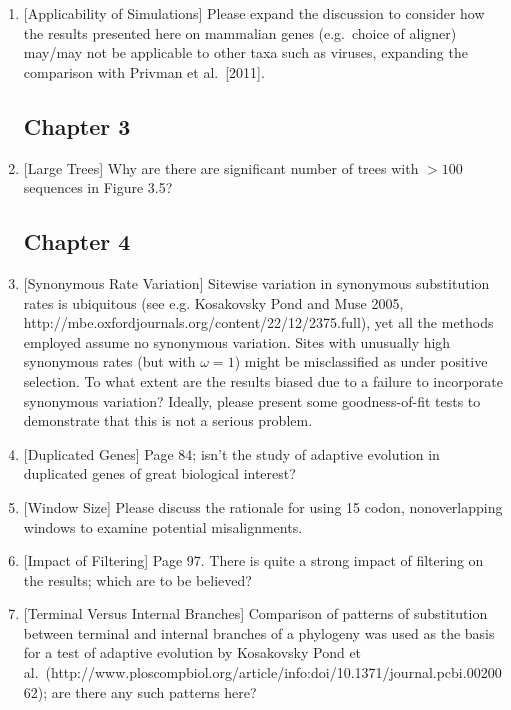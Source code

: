 \begin{enumerate}
\item{[Applicability of Simulations] Please expand the discussion to consider how the results presented
here on mammalian genes (e.g.\ choice of aligner) may/may not be
applicable to other taxa such as viruses, expanding the comparison
with Privman et al.\ [2011].}

\subsection{Chapter 3}

\item{[Large Trees] Why are there are significant number of trees with $>100$ sequences in
Figure 3.5?}

\subsection{Chapter 4}

\item{[Synonymous Rate Variation] Sitewise variation in synonymous substitution rates is ubiquitous (see
e.g. Kosakovsky Pond and Muse 2005,
http://mbe.oxfordjournals.org/content/22/12/2375.full), yet all the
methods employed assume no synonymous variation. Sites with unusually
high synonymous rates (but with $\omega=1$) might be misclassified as
under positive selection. To what extent are the results biased due to
a failure to incorporate synonymous variation? Ideally, please present
some goodness-of-fit tests to demonstrate that this is not a serious
problem.}

\item{[Duplicated Genes] Page 84; isn't the study of adaptive evolution in duplicated genes of
great biological interest?}

\item{[Window Size] Please discuss the rationale for using 15 codon, nonoverlapping
windows to examine potential misalignments.}

\item{[Impact of Filtering] Page 97. There is quite a strong impact of filtering on the results;
which are to be believed?}

\item{[Terminal Versus Internal Branches] Comparison of patterns of substitution between terminal and internal
branches of a phylogeny was used as the basis for a test of adaptive
evolution by Kosakovsky Pond et al.\
(http://www.ploscompbiol.org/article/info:doi/10.1371/journal.pcbi.0020062);
are there any such patterns here?}


\end{enumerate}
